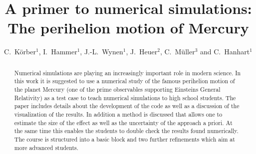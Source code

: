 \documentclass[12pt,ngerman,american]{iopart}
\begin{document}
\title[A primer to numerical simulations]{A primer to numerical simulations: The perihelion motion of Mercury}

\author{
	C.~K\"orber$^{1}$,
	I.~Hammer$^{1}$,
	J.-L.~Wynen$^{1}$,
	J.~Heuer$^{2}$,
	C.~M\"uller$^{3}$ and
	C.~Hanhart$^{1}$
}
\address{
	$^1$ \textit{Institut f\"ur Kernphysik (IKP-3) and Institute for Advanced Simulations (IAS-4), Forschungszentrum J\"ulich, D-52425 J\"ulich, Germany}\\
	$^2$ \textit{Institut f\"ur Neurowissenschaften und Medizin (INM-4), Forschungszentrum J\"ulich, D-52425 J\"ulich, Germany}\\
	$^3$ \textit{JuLab, Forschungszentrum J\"ulich, D-52425 J\"ulich, Germany}
}
\vspace{10pt}

\begin{abstract}
Numerical simulations are playing an increasingly important role in modern science.
In this work it is suggested to use a numerical study of the famous perihelion motion of the planet Mercury (one of the prime observables supporting Einsteins General Relativity) as a test case to teach numerical simulations to high school students.
The paper includes details about the development of the code as well as a discussion of the visualization of the results.
In addition a method is discussed that allows one to estimate the size of the effect as well as the uncertainty of 
the approach a priori. At the same time this enables the students to double check the results found numerically.
The course is structured into a basic block and two further refinements which aim at more advanced students.
\end{abstract}

%
%
%
% 
%
\end{document}
